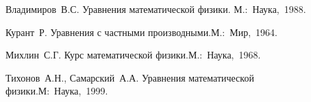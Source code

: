\begin{thebibliography}{99}
Владимиров~В.С. Уравнения математической физики. М.:~Наука,~1988.

Курант~Р. Уравнения с частными производными.М.:~Мир,~1964.

Михлин~С.Г. Курс математической физики.М.:~Наука,~1968.

Тихонов~А.Н., Самарский~А.А. Уравнения математической физики.М:~Наука,~1999.

\end{thebibliography}





%

